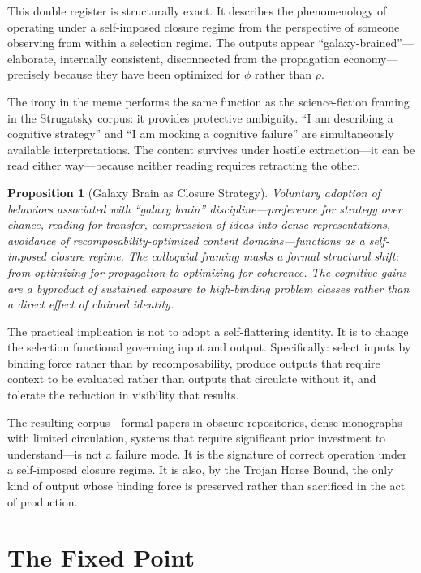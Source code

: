 \documentclass[12pt]{article}
\newtheorem{proposition}{Proposition}[section]
\newcommand{\bind}{\phi}
\newcommand{\recomp}{\rho}
\begin{document}
This double register is structurally exact. It describes the phenomenology
of operating under a self-imposed closure regime from the perspective of
someone observing from within a selection regime. The outputs appear
``galaxy-brained''---elaborate, internally consistent, disconnected from
the propagation economy---precisely because they have been optimized for
$\bind$ rather than $\recomp$.

The irony in the meme performs the same function as the science-fiction
framing in the Strugatsky corpus: it provides protective ambiguity.
``I am describing a cognitive strategy'' and ``I am mocking a cognitive
failure'' are simultaneously available interpretations. The content
survives under hostile extraction---it can be read either way---because
neither reading requires retracting the other.

\begin{proposition}[Galaxy Brain as Closure Strategy]
\label{prop:galaxybrain}
Voluntary adoption of behaviors associated with ``galaxy brain''
discipline---preference for strategy over chance, reading for transfer,
compression of ideas into dense representations, avoidance of
recomposability-optimized content domains---functions as a self-imposed
closure regime. The colloquial framing masks a formal structural shift:
from optimizing for propagation to optimizing for coherence. The
cognitive gains are a byproduct of sustained exposure to high-binding
problem classes rather than a direct effect of claimed identity.
\end{proposition}

The practical implication is not to adopt a self-flattering identity. It
is to change the selection functional governing input and output.
Specifically: select inputs by binding force rather than by
recomposability, produce outputs that require context to be evaluated
rather than outputs that circulate without it, and tolerate the
reduction in visibility that results.

The resulting corpus---formal papers in obscure repositories, dense
monographs with limited circulation, systems that require significant
prior investment to understand---is not a failure mode. It is the
signature of correct operation under a self-imposed closure regime. It
is also, by the Trojan Horse Bound, the only kind of output whose
binding force is preserved rather than sacrificed in the act of
production.

\section{The Fixed Point}
\label{sec:fixedpoint}
\end{document}
